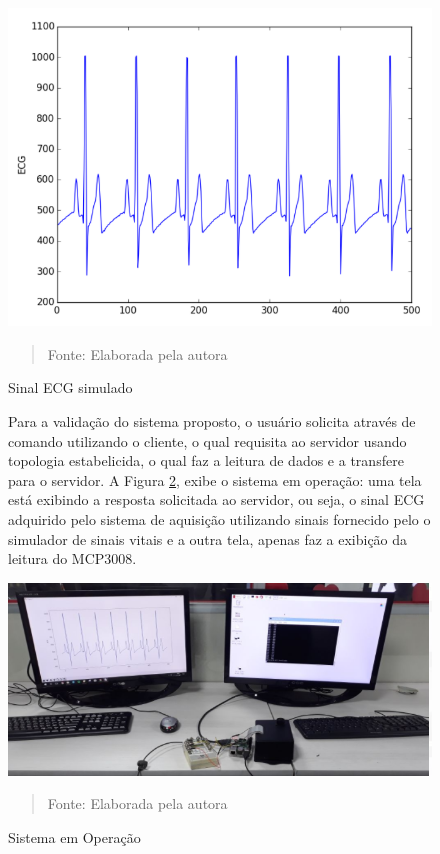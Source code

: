 \documentclass[12pt, a4paper]{article}
\begin{document}
\begin{figure}[H]
\begin{center}
			\caption{Sinal ECG simulado}
			\includegraphics[width=.8\textwidth]{Figuras/sinal.PNG}
                          						\vspace*{\fill} 
            \begin{quote} 
            \centering 
           Fonte: Elaborada pela autora
            \end{quote}
            \vspace*{\fill}
			\label{fig:ecg2}
\end{center}
\end{figure}
\begin{figure}[H]

\hspace*{0.8cm}Para a validação do sistema proposto, o usuário solicita através de comando utilizando o cliente, o qual requisita ao servidor usando topologia estabelicida, o qual faz a leitura de dados e a transfere para o servidor. A Figura \ref{fig:syst}, exibe o sistema em operação: uma tela está exibindo a resposta solicitada ao servidor, ou seja, o sinal ECG adquirido pelo sistema de aquisição utilizando sinais fornecido pelo o  simulador de sinais vitais e a outra tela, apenas faz a exibição da leitura do MCP3008.

\begin{center}
			\caption{Sistema em Operação}
			\includegraphics[width=.9\textwidth]{sist.PNG}
            	\vspace*{\fill} 
            \begin{quote} 
            \centering 
           Fonte: Elaborada pela autora
            \end{quote}
            \vspace*{\fill}
			\label{fig:syst}
\end{center}
\end{figure}
\end{document}
